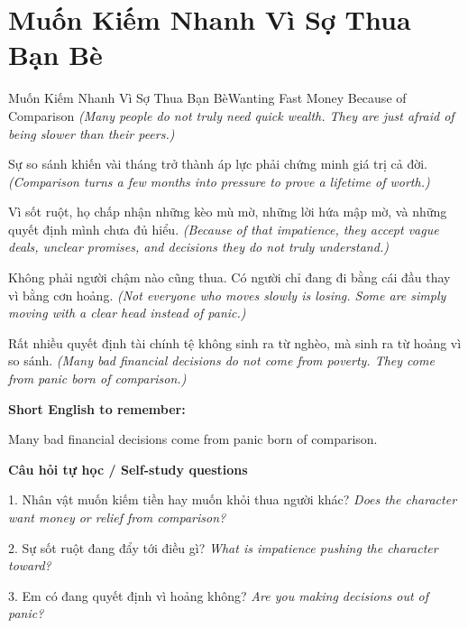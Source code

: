 \section{Muốn Kiếm Nhanh Vì Sợ Thua Bạn Bè}
\begin{truyen}{Muốn Kiếm Nhanh Vì Sợ Thua Bạn Bè}{Wanting Fast Money Because of Comparison}
\textit{(Many people do not truly need quick wealth. They are just afraid of being slower than their peers.)}

Sự so sánh khiến vài tháng trở thành áp lực phải chứng minh giá trị cả đời.
\textit{(Comparison turns a few months into pressure to prove a lifetime of worth.)}

Vì sốt ruột, họ chấp nhận những kèo mù mờ, những lời hứa mập mờ, và những quyết định mình chưa đủ hiểu.
\textit{(Because of that impatience, they accept vague deals, unclear promises, and decisions they do not truly understand.)}

Không phải người chậm nào cũng thua. Có người chỉ đang đi bằng cái đầu thay vì bằng cơn hoảng.
\textit{(Not everyone who moves slowly is losing. Some are simply moving with a clear head instead of panic.)}

\end{truyen}

\begin{baihoc}
Rất nhiều quyết định tài chính tệ không sinh ra từ nghèo, mà sinh ra từ hoảng vì so sánh.
\textit{(Many bad financial decisions do not come from poverty. They come from panic born of comparison.)}
\end{baihoc}

\begin{ghinhoanh}
\textbf{Short English to remember:}

Many bad financial decisions come from panic born of comparison.

\end{ghinhoanh}

\begin{tuhocnhanh}
\textbf{Câu hỏi tự học / Self-study questions}

1. Nhân vật muốn kiếm tiền hay muốn khỏi thua người khác? \textit{Does the character want money or relief from comparison?}

2. Sự sốt ruột đang đẩy tới điều gì? \textit{What is impatience pushing the character toward?}

3. Em có đang quyết định vì hoảng không? \textit{Are you making decisions out of panic?}
\end{tuhocnhanh}
\ngancach

